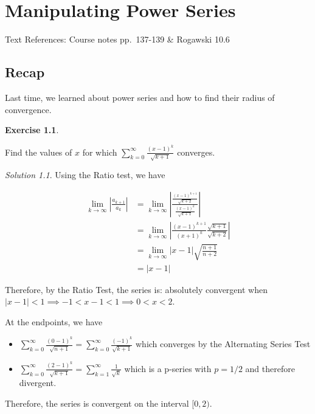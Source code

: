 \documentclass[
]{book}
\providecommand{\tightlist}{%
  \setlength{\itemsep}{0pt}\setlength{\parskip}{0pt}}
\theoremstyle{definition}
\theoremstyle{definition}
\theoremstyle{definition}
\newtheorem{exercise}{Exercise}[chapter]
\theoremstyle{definition}
\theoremstyle{remark}
\newtheorem*{solution}{Solution}
\begin{document}
\hypertarget{lec-32}{%
\chapter{Manipulating Power Series}\label{lec-32}}

Text References: Course notes pp.~137-139 \& Rogawski 10.6

\hypertarget{recap-30}{%
\section{Recap}\label{recap-30}}

Last time, we learned about power series and how to find their radius of convergence.

\begin{exercise}
\protect\hypertarget{exr:unlabeled-div-243}{}\label{exr:unlabeled-div-243}

Find the values of \(x\) for which \(\displaystyle \sum_{k=0}^\infty \frac{(x-1)^k}{\sqrt{k+1}}\) converges.

\end{exercise}

\begin{solution}

Using the Ratio test, we have

\begin{align*}
\lim_{k\to\infty}\left | \frac{a_{k+1}}{a_k}\right| &= \lim_{k\to\infty}\left | \frac{\frac{(x-1)^{k+1}}{\sqrt{k+2}}}{\frac{(x-1)^k}{\sqrt{k+1}}}\right | \\
&= \lim_{k\to\infty} \left | \frac{(x-1)^{k+1}}{(x+1)^k}\frac{\sqrt{k+1}}{\sqrt{k+2}}\right | \\
&= \lim_{k\to\infty} |x-1| \sqrt{\frac{n+1}{n+2}}\\
&= |x-1|
\end{align*}

Therefore, by the Ratio Test, the series is: absolutely convergent when \(|x-1|<1 \implies -1 < x-1<1 \implies 0<x<2\).

At the endpoints, we have

\begin{itemize}
\tightlist
\item
  \(\displaystyle \sum_{k=0}^\infty \frac{(0-1)^k}{\sqrt{n+1}}=\sum_{k=0}^\infty \frac{(-1)^k}{\sqrt{k+1}}\) which converges by the Alternating Series Test
\item
  \(\displaystyle \sum_{k=0}^\infty \frac{(2-1)^k}{\sqrt{k+1}}=\sum_{k=1}^\infty\frac{1}{\sqrt{k}}\) which is a p-series with \(p=1/2\) and therefore divergent.
\end{itemize}

Therefore, the series is convergent on the interval \([0,2)\).

\end{solution}
\end{document}
